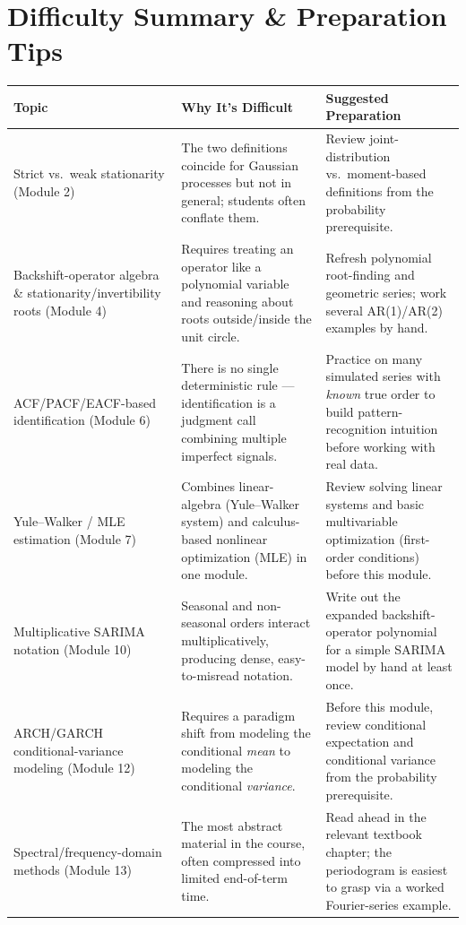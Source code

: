 \documentclass[11pt]{article}
\begin{document}
\section{Difficulty Summary \& Preparation Tips}

\renewcommand{\arraystretch}{1.3}
\begin{longtable}{p{3.8cm} p{6.0cm} p{5.3cm}}
\toprule
\textbf{Topic} & \textbf{Why It's Difficult} & \textbf{Suggested Preparation} \\
\midrule
\endhead
Strict vs.\ weak stationarity (Module 2) &
  The two definitions coincide for Gaussian processes but not in general; students often conflate them. &
  Review joint-distribution vs.\ moment-based definitions from the probability prerequisite. \\
Backshift-operator algebra \& stationarity/invertibility roots (Module 4) &
  Requires treating an operator like a polynomial variable and reasoning about roots outside/inside the
  unit circle. &
  Refresh polynomial root-finding and geometric series; work several AR(1)/AR(2) examples by hand. \\
ACF/PACF/EACF-based identification (Module 6) &
  There is no single deterministic rule --- identification is a judgment call combining multiple
  imperfect signals. &
  Practice on many simulated series with \emph{known} true order to build pattern-recognition intuition
  before working with real data. \\
Yule--Walker / MLE estimation (Module 7) &
  Combines linear-algebra (Yule--Walker system) and calculus-based nonlinear optimization (MLE) in one
  module. &
  Review solving linear systems and basic multivariable optimization (first-order conditions) before
  this module. \\
Multiplicative SARIMA notation (Module 10) &
  Seasonal and non-seasonal orders interact multiplicatively, producing dense, easy-to-misread notation. &
  Write out the expanded backshift-operator polynomial for a simple SARIMA model by hand at least once. \\
ARCH/GARCH conditional-variance modeling (Module 12) &
  Requires a paradigm shift from modeling the conditional \emph{mean} to modeling the conditional
  \emph{variance}. &
  Before this module, review conditional expectation and conditional variance from the probability
  prerequisite. \\
Spectral/frequency-domain methods (Module 13) &
  The most abstract material in the course, often compressed into limited end-of-term time. &
  Read ahead in the relevant textbook chapter; the periodogram is easiest to grasp via a worked
  Fourier-series example. \\
\bottomrule
\end{longtable}
\end{document}
